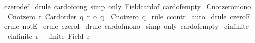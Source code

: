 \begin{isabellebody}
%
\isadelimproof
%
\endisadelimproof
%
\isatagproof
{}\isamarkupfalse%
\ czero{\isacharunderscore}{\kern0pt}def\isanewline
{}\isamarkupfalse%
\ {\isacharparenleft}{\kern0pt}drule\ card{\isacharunderscore}{\kern0pt}of{\isacharunderscore}{\kern0pt}cong{\isacharparenright}{\kern0pt}\ {\isacharparenleft}{\kern0pt}simp\ only{\isacharcolon}{\kern0pt}\ Field{\isacharunderscore}{\kern0pt}card{\isacharunderscore}{\kern0pt}of\ card{\isacharunderscore}{\kern0pt}of{\isacharunderscore}{\kern0pt}empty{}{\isacharparenright}{\kern0pt}%
\endisatagproof
{\isafoldproof}%
%
\isadelimproof
\isanewline
%
\endisadelimproof
\isanewline
{}\isamarkupfalse%
\ Cnotzero{\isacharunderscore}{\kern0pt}mono{\isacharcolon}{\kern0pt}\isanewline
\ \ {\isachardoublequoteopen}{\isasymlbrakk}Cnotzero\ r{\isacharsemicolon}{\kern0pt}\ Card{\isacharunderscore}{\kern0pt}order\ q{\isacharsemicolon}{\kern0pt}\ r\ {\isasymle}o\ q{\isasymrbrakk}\ {\isasymLongrightarrow}\ Cnotzero\ q{\isachardoublequoteclose}\isanewline
%
\isadelimproof
%
\endisadelimproof
%
\isatagproof
{}\isamarkupfalse%
\ {\isacharparenleft}{\kern0pt}rule\ ccontr{\isacharparenright}{\kern0pt}\isanewline
{}\isamarkupfalse%
\ auto\isanewline
{}\isamarkupfalse%
\ {\isacharparenleft}{\kern0pt}drule\ czeroE{\isacharparenright}{\kern0pt}\isanewline
{}\isamarkupfalse%
\ {\isacharparenleft}{\kern0pt}erule\ notE{\isacharparenright}{\kern0pt}\isanewline
{}\isamarkupfalse%
\ {\isacharparenleft}{\kern0pt}erule\ czeroI{\isacharparenright}{\kern0pt}\isanewline
{}\isamarkupfalse%
\ {\isacharparenleft}{\kern0pt}drule\ card{\isacharunderscore}{\kern0pt}of{\isacharunderscore}{\kern0pt}mono{}{\isacharparenright}{\kern0pt}\isanewline
{}\isamarkupfalse%
\ {\isacharparenleft}{\kern0pt}simp\ only{\isacharcolon}{\kern0pt}\ card{\isacharunderscore}{\kern0pt}of{\isacharunderscore}{\kern0pt}empty{}{\isacharparenright}{\kern0pt}\isanewline
{}\isamarkupfalse%
%
\endisatagproof
{\isafoldproof}%
%
\isadelimproof
%
\endisadelimproof
%
\isadelimdocument
%
\endisadelimdocument
%
\isatagdocument
%
\isamarkuptrue%
%
\endisatagdocument
{\isafolddocument}%
%
\isadelimdocument
%
\endisadelimdocument
{}\isamarkupfalse%
\ cinfinite\ \isanewline
\ \ {\isachardoublequoteopen}cinfinite\ r\ {\isacharequal}{\kern0pt}\ {\isacharparenleft}{\kern0pt}{\isasymnot}\ finite\ {\isacharparenleft}{\kern0pt}Field\ r{\isacharparenright}{\kern0pt}{\isacharparenright}{\kern0pt}{\isachardoublequoteclose}\isanewline

\end{isabellebody}
